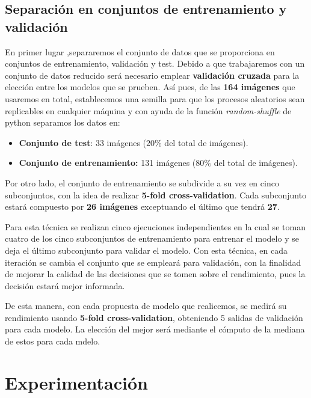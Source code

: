     \subsection{Separación en conjuntos de entrenamiento y validación}
        \noindent En primer lugar ,separaremos el conjunto de datos que se proporciona en conjuntos de entrenamiento, validación y test. Debido a que trabajaremos con un conjunto de datos reducido será necesario emplear \textbf{validación cruzada} para la elección entre los modelos que se prueben. Así pues, de las \textbf{164 imágenes} que usaremos en total, establecemos una semilla para que los procesos aleatorios sean replicables en cualquier máquina y con ayuda de la función \textit{random-shuffle} de python separamos los datos en: 

        \begin{itemize}
            \item \textbf{Conjunto de test}: 33 imágenes ($20\%$ del total de imágenes).
            \item \textbf{Conjunto de entrenamiento:} 131 imágenes ($80\%$ del total de imágenes).
        \end{itemize}

        \noindent Por otro lado, el conjunto de entrenamiento se subdivide a su vez en cinco subconjuntos, con la idea de realizar \textbf{5-fold cross-validation}. Cada subconjunto estará compuesto por \textbf{26 imágenes} exceptuando el último que tendrá \textbf{27}.
        
        \medskip

        \noindent Para esta técnica se realizan cinco ejecuciones independientes en la cual se toman cuatro de los cinco subconjuntos de entrenamiento para entrenar el modelo y se deja el último subconjunto para validar el modelo. Con esta técnica, en cada iteración se cambia el conjunto que se empleará para validación, con la finalidad de mejorar la calidad de las decisiones que se tomen sobre el rendimiento, pues la decisión estará mejor informada. 

        \medskip

        \noindent De esta manera, con cada propuesta de modelo que realicemos, se medirá su rendimiento usando \textbf{5-fold cross-validation}, obteniendo 5 salidas de validación para cada modelo. La elección del mejor será mediante el cómputo de la mediana de estos para cada mdelo.


\section{Experimentación}
